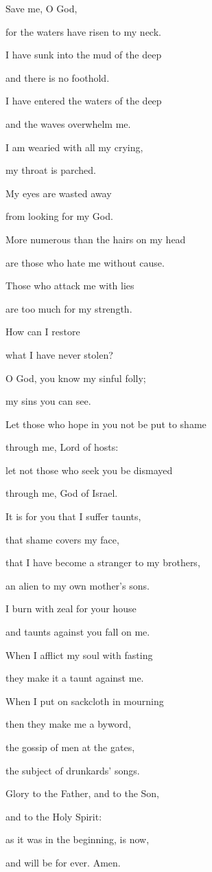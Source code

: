 \noindent Save me, O God,~\GreStar{}~\nopagebreak

for the waters have risen to my neck.

\noindent I have sunk into the mud of the deep~\GreStar{}~\nopagebreak

and there is no foothold.

\noindent I have entered the waters of the deep~\GreStar{}~\nopagebreak

and the waves overwhelm me.

\noindent I am wearied with all my crying,~\GreStar{}~\nopagebreak

my throat is parched.

\noindent My eyes are wasted away~\GreStar{}~\nopagebreak

from looking for my God.

\noindent More numerous than the hairs on my head~\GreStar{}~\nopagebreak

are those who hate me without cause.

\noindent Those who attack me with lies~\GreStar{}~\nopagebreak

are too much for my strength.

\noindent How can I restore~\GreStar{}~\nopagebreak

what I have never stolen?

\noindent O God, you know my sinful folly;~\GreStar{}~\nopagebreak

my sins you can see.

\noindent Let those who hope in you not be put to shame~\GreStar{}~\nopagebreak

through me, Lord of hosts:

\noindent let not those who seek you be dismayed~\GreStar{}~\nopagebreak

through me, God of Israel.

\noindent It is for you that I suffer taunts,~\GreStar{}~\nopagebreak

that shame covers my face,

\noindent that I have become a stranger to my brothers,~\GreStar{}~\nopagebreak

an alien to my own mother’s sons.

\noindent I burn with zeal for your house~\GreStar{}~\nopagebreak

and taunts against you fall on me.

\noindent When I afflict my soul with fasting~\GreStar{}~\nopagebreak

they make it a taunt against me.

\noindent When I put on sackcloth in mourning~\GreStar{}~\nopagebreak

then they make me a byword,

\noindent the gossip of men at the gates,~\GreStar{}~\nopagebreak

the subject of drunkards’ songs.

\noindent Glory to the Father, and to the Son,~\GreStar{}~\nopagebreak

and to the Holy Spirit:

\noindent as it was in the beginning, is now,~\GreStar{}~\nopagebreak

and will be for ever. Amen.
